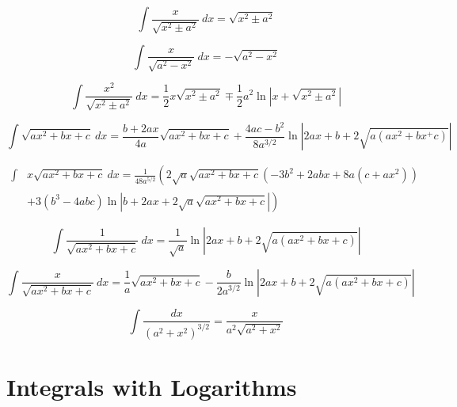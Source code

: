 \documentclass[12pt,letterpaper,leqno]{article}
\begin{document}
\begin{equation}
\int \frac{x}{\sqrt{x^2\pm a^2}}\ dx = \sqrt{x^2 \pm a^2} 
\end{equation}

\begin{equation}
\int \frac{x}{\sqrt{a^2-x^2}}\ dx = -\sqrt{a^2-x^2} 
\end{equation}

\begin{equation}\label{eq:Russ}
\int \frac{x^2}{\sqrt{x^2 \pm a^2}}\ dx = \frac{1}{2}x\sqrt{x^2 \pm a^2}
\mp \frac{1}{2}a^2 \ln \left| x + \sqrt{x^2\pm a^2} \right | 
\end{equation}

\begin{equation}\label{eq:Winokur1}
\int \sqrt{a x^2 + b x + c}\ dx = 
\frac{b+2ax}{4a}\sqrt{ax^2+bx+c}
+
\frac{4ac-b^2}{8a^{3/2}}\ln \left| 2ax + b + 2\sqrt{a(ax^2+bx^+c)}\right |
\end{equation}

\begin{equation}\label{eq:Larry-Morris}\begin{split}
\int &x \sqrt{a x^2 + bx + c}\ dx = \frac{1}{48a^{5/2}}\left ( 
2 \sqrt{a} \sqrt{ax^2+bx+c}
\right .  
  \left( - 3b^2 + 2 abx + 8 a(c+ax^2) \right)
\\ &  \left.
 + 3(b^3-4abc)\ln \left|b + 2ax + 2\sqrt{a}\sqrt{ax^2+bx+c} \right| \right)
 \end{split}
\end{equation}

\begin{equation}
\int\frac{1}{\sqrt{ax^2+bx+c}}\ dx=
\frac{1}{\sqrt{a}}\ln \left| 2ax+b + 2 \sqrt{a(ax^2+bx+c)} \right | 
\end{equation}

\begin{equation}\label{eq:Duley}
\int \frac{x}{\sqrt{ax^2+bx+c}}\ dx=
\frac{1}{a}\sqrt{ax^2+bx + c} 
-
\frac{b}{2a^{3/2}}\ln \left| 2ax+b + 2 \sqrt{a(ax^2+bx+c)} \right |
\end{equation}

\begin{equation}\label{eq:Winokur2}
\int\frac{dx}{(a^2+x^2)^{3/2}}=\frac{x}{a^2\sqrt{a^2+x^2}}
\end{equation}



\section*{Integrals with Logarithms}
\end{document}
